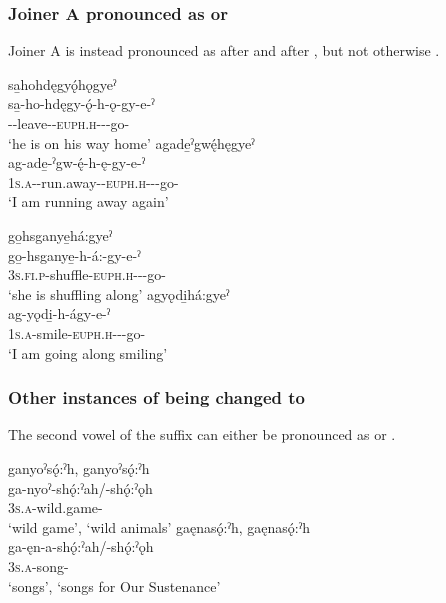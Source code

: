 \subsubsection*{Joiner A pronounced as  or } \label{Joiner A pronounced as Ǫ or Ę}
Joiner A is instead pronounced as  after  and  after  , but not otherwise .

\newpage
\ea\label{ex:tlhex} 
\ea sa̱hohdęgyǫ́hǫgyeˀ\\
\gll sa̱-ho-hdęgy-ǫ́-h-ǫ-gy-e-ˀ\\
 {\repetitive}--leave-{\stative}-\textsc{euph.h}-{\joinerA}-{\progressive}-go-{\stative}\\
\glt `he is on his way home'
\ex agade̱ˀgwę́hęgyeˀ\\
\gll ag-ade̱-ˀgw-ę́-h-ę-gy-e-ˀ\\
 \textsc{1s.a}-{\semireflexive}-run.away-{\stative}-\textsc{euph.h}-{\joinerA}-{\progressive}-go-{\stative}\\
\glt `I am running away again'
\z
\z

\ea\label{ex:tlhex2}
\ea go̱hsganye̱há:gyeˀ\\
\gll go̱-hsganye̱-h-á:-gy-e-ˀ\\
 \textsc{3s.fi.p}-shuffle-\textsc{euph.h}-{\joinerA}-{\progressive}-go-{\stative}\\
\glt `she is shuffling along'
\ex agyǫdi̱há:gyeˀ\\
\gll ag-yǫdi̱-h-ágy-e-ˀ\\
 \textsc{1s.a}-smile-\textsc{euph.h}-{\joinerA}-{\progressive}-go-{\stative}\\
\glt `I am going along smiling'
\z
\z

\subsubsection*{Other instances of  being changed to } \label{Other instances of A being changed to Ǫ}
The second vowel of the  \textsc{\pluralizer} suffix can either be pronounced as  or  .

\ea\label{ex:tlhex3}
\ea ganyoˀsǫ́:ˀh, ganyoˀsǫ́:ˀh \\
\gll ga-nyoˀ-shǫ́:ˀah/-shǫ́:ˀǫh\\
 \textsc{3s.a}-wild.game-{\pluralizer}\\
\glt ‘wild game’, `wild animals'
\ex gaęnasǫ́:ˀh, gaęnasǫ́:ˀh \\
\gll ga-ęn-a-shǫ́:ˀah/-shǫ́:ˀǫh\\
 \textsc{3s.a}-song-{\pluralizer}\\
\glt ‘songs’, `songs for Our Sustenance'
\z
\z

